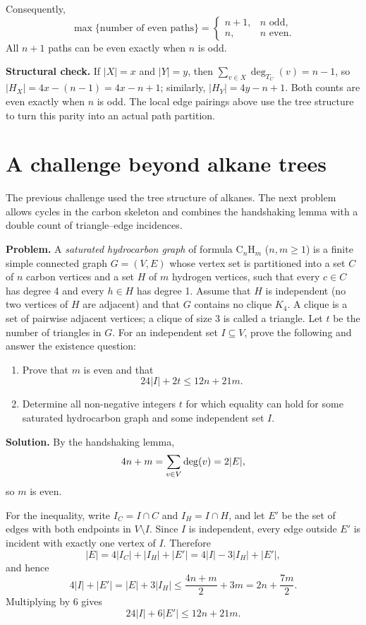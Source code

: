 Consequently,
\[
\max\{\text{number of even paths}\}=
\begin{cases}
n+1,&n\text{ odd},\\
n,&n\text{ even}.
\end{cases}
\]
All $n+1$ paths can be even exactly when $n$ is odd.

\textbf{Structural check.} If $|X|=x$ and $|Y|=y$, then $\sum_{v\in X}\deg_{T_C}(v)=n-1$, so $|H_X|=4x-(n-1)=4x-n+1$; similarly, $|H_Y|=4y-n+1$. Both counts are even exactly when $n$ is odd. The local edge pairings above use the tree structure to turn this parity into an actual path partition.

\section*{A challenge beyond alkane trees}
The previous challenge used the tree structure of alkanes. The next problem allows cycles in the carbon skeleton and combines the handshaking lemma with a double count of triangle--edge incidences.

\Challenge{} \Uni{} \textbf{Problem.} A \emph{saturated hydrocarbon graph} of formula $\mathrm{C}_n\mathrm{H}_m$ ($n,m\geq1$) is a finite simple connected graph $G=(V,E)$ whose vertex set is partitioned into a set $C$ of $n$ carbon vertices and a set $H$ of $m$ hydrogen vertices, such that every $c\in C$ has degree 4 and every $h\in H$ has degree 1. Assume that $H$ is independent (no two vertices of $H$ are adjacent) and that $G$ contains no clique $K_4$. A clique is a set of pairwise adjacent vertices; a clique of size 3 is called a triangle. Let $t$ be the number of triangles in $G$. For an independent set $I\subseteq V$, prove the following and answer the existence question:
\begin{enumerate}
\item Prove that $m$ is even and that
\[
24|I|+2t\leq 12n+21m.
\]
\item Determine all non-negative integers $t$ for which equality can hold for some saturated hydrocarbon graph and some independent set $I$.
\end{enumerate}

\textbf{Solution.} By the handshaking lemma,
\[
4n+m=\sum_{v\in V}\operatorname{deg}(v)=2|E|,
\]
so $m$ is even.

For the inequality, write $I_C=I\cap C$ and $I_H=I\cap H$, and let $E'$ be the set of edges with both endpoints in $V\setminus I$. Since $I$ is independent, every edge outside $E'$ is incident with exactly one vertex of $I$. Therefore
\[
|E|=4|I_C|+|I_H|+|E'|=4|I|-3|I_H|+|E'|,
\]
and hence
\[
4|I|+|E'|=|E|+3|I_H|
\leq \frac{4n+m}{2}+3m
=2n+\frac{7m}{2}.
\]
Multiplying by 6 gives
\[
24|I|+6|E'|\leq 12n+21m. \tag{1}
\]


